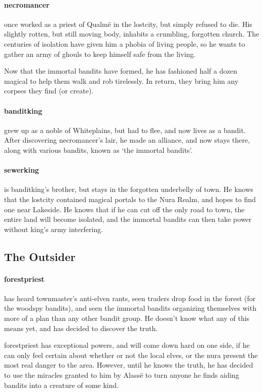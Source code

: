 \begin{multicols}{2}
\paragraph{\Gls{necromancer}}
once worked as a priest of Qualm\"e in the \gls{lostcity}, but simply refused to die.
His slightly rotten, but still moving body, inhabits a crumbling, forgotten church.
The centuries of isolation have given him a phobia of living people, so he wants to gather an army of ghouls to keep himself safe from the living.

Now that the immortal bandits have formed, he has fashioned half a dozen magical to help them walk and rob tirelessly.
In return, they bring him any corpses they find (or create).

\paragraph{\gls{banditking}}
grew up as a noble of Whiteplains, but had to flee, and now lives as a bandit.
After discovering \gls{necromancer}'s lair, he made an alliance, and now stays there, along with various bandits, known as `the immortal bandits'.

\paragraph{\gls{sewerking}}
is \gls{banditking}'s brother, but stays in the forgotten underbelly of \gls{town}.
He knows that the \gls{lostcity} contained magical portals to the Nura Realm, and hopes to find one near Lakeside.
He knows that if he can cut off the only road to \gls{town}, the entire land will become isolated, and the immortal bandits can then take power without \gls{king}'s army interfering.

\subsection{The Outsider}

\paragraph{\gls{forestpriest}}
has heard \gls{townmaster}'s anti-elven rants, seen traders drop food in the forest (for the woodspy bandits), and seen the immortal bandits organizing themselves with more of a plan than any other bandit group.
He doesn't know what any of this means yet, and has decided to discover the truth.

\Gls{forestpriest} has exceptional powers, and will come down hard on one side, if he can only feel certain about whether or not the local elves, or the nura present the most real danger to the area.
However, until he knows the truth, he has decided to use the miracles granted to him by Alass\"e to turn anyone he finds aiding bandits into a creature of some kind.


\end{multicols}
